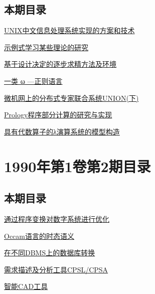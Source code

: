 \documentclass[a4paper]{article}
\begin{document}
\subsection{本期目录}
\href{http://www.jos.org.cn/ch/reader/download_pdf.aspx?file_no=19900301&year_id=1990&quarter_id=3&falg=1}{UNIX中文信息处理系统实现的方案和技术}

\href{http://www.jos.org.cn/ch/reader/download_pdf.aspx?file_no=19900302&year_id=1990&quarter_id=3&falg=1}{示例式学习某些理论的研究}

\href{http://www.jos.org.cn/ch/reader/download_pdf.aspx?file_no=19900303&year_id=1990&quarter_id=3&falg=1}{基于设计决定的逐步求精方法及环境}

\href{http://www.jos.org.cn/ch/reader/download_pdf.aspx?file_no=19900304&year_id=1990&quarter_id=3&falg=1}{一类 ω —正则语言}

\href{http://www.jos.org.cn/ch/reader/download_pdf.aspx?file_no=19900305&year_id=1990&quarter_id=3&falg=1}{微机网上的分布式专家联合系统UNION(下)}

\href{http://www.jos.org.cn/ch/reader/download_pdf.aspx?file_no=19900306&year_id=1990&quarter_id=3&falg=1}{Prology程序部分计算的研究与实现}

\href{http://www.jos.org.cn/ch/reader/download_pdf.aspx?file_no=19900307&year_id=1990&quarter_id=3&falg=1}{具有代数算子的λ演算系统的模型构造}


\section{\textbf{1990年第1卷第2期目录}}
\subsection{本期目录}
\href{http://www.jos.org.cn/ch/reader/download_pdf.aspx?file_no=19900201&year_id=1990&quarter_id=2&falg=1}{通过程序变换对数字系统进行优化}

\href{http://www.jos.org.cn/ch/reader/download_pdf.aspx?file_no=19900202&year_id=1990&quarter_id=2&falg=1}{Occam语言的时态语义}

\href{http://www.jos.org.cn/ch/reader/download_pdf.aspx?file_no=19900203&year_id=1990&quarter_id=2&falg=1}{在不同DBMS上的数据库转换}

\href{http://www.jos.org.cn/ch/reader/download_pdf.aspx?file_no=19900204&year_id=1990&quarter_id=2&falg=1}{需求描述及分析工具CPSL/CPSA}

\href{http://www.jos.org.cn/ch/reader/download_pdf.aspx?file_no=19900205&year_id=1990&quarter_id=2&falg=1}{智能CAD工具}
\end{document}

